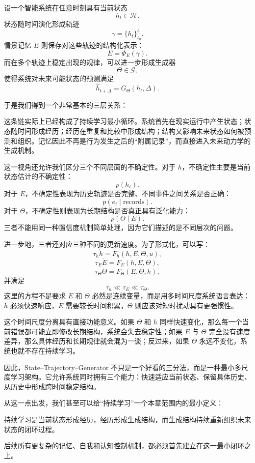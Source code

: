 设一个智能系统在任意时刻具有当前状态
\[
h_t\in\mathcal{H}.
\]
状态随时间演化形成轨迹
\[
\gamma
=
\{h_t\}_{t_0}^{t_1}.
\]
情景记忆 $E$ 则保存对这些轨迹的结构化表示：
\[
E
=
\Phi_E(\gamma).
\]
而在多个轨迹上稳定出现的规律，可以进一步形成生成器
\[
\Theta
\in
\mathcal{G},
\]
使得系统对未来可能状态的预测满足
\[
\hat h_{t+\Delta}
=
G_\Theta(h_t,\Delta).
\]

于是我们得到一个非常基本的三层关系：
\begin{statementbox}
\centering
{}
\end{statementbox}
这条链实际上已经构成了持续学习最小循环。系统首先在现实运行中产生状态；状态随时间形成经历；经历在重复和比较中形成结构；结构又影响未来状态如何被预测和组织。记忆因此不再是行为发生之后的“附属记录”，而直接进入未来动力学的生成机制。

这一视角还允许我们区分三个不同层面的不确定性。对于 $h$，不确定性主要是当前状态估计的不确定性：
\[
p(h_t).
\]
对于 $E$，不确定性表现为历史轨迹是否完整、不同事件之间关系是否正确：
\[
p(e_i\mid \text{records}).
\]
对于 $\Theta$，不确定性则表现为长期结构是否真正具有泛化能力：
\[
p(\Theta\mid E).
\]
三者不能用同一种置信度机制简单处理，因为它们描述的是不同层次的问题。

进一步地，三者还对应三种不同的更新速度。为了形式化，可以写：
\[
\tau_h\dot h
=
F_h(h,E,\Theta,u),
\]
\[
\tau_E\dot E
=
F_E(h,E,\Theta),
\]
\[
\tau_\Theta\dot\Theta
=
F_\Theta(E,\Theta,h),
\]
并满足
\[
\boxed{
\tau_h\ll\tau_E\ll\tau_\Theta.
}
\]
这里的方程不是要求 $E$ 和 $\Theta$ 必然是连续变量，而是用多时间尺度系统语言表达：$h$ 必须快速响应，$E$ 需要较长时间积累，$\Theta$ 则应该对短时扰动具有更强惯性。

这个时间尺度分离具有直接功能意义。如果 $\Theta$ 和 $h$ 同样快速变化，那么每一个当前错误都可能立即修改长期结构，系统会失去稳定性；如果 $E$ 与 $\Theta$ 完全没有速度差异，那么具体经历和长期规律就会混为一谈；反过来，如果 $\Theta$ 永远不变化，系统也就不存在持续学习。

因此，State--Trajectory--Generator 不只是一个好看的三分法，而是一种最小多尺度学习架构。它允许系统同时拥有三个能力：快速适应当前状态、保留具体历史、从历史中形成跨时间稳定结构。

从这一点出发，我们甚至可以给“持续学习”一个本章范围内的最小定义：
\begin{definition*}
持续学习是当前状态形成经历，经历形成生成结构，而生成结构持续重新组织未来状态的闭环过程。
\end{definition*}
后续所有更复杂的记忆、自我和认知控制机制，都必须首先建立在这一最小闭环之上。


